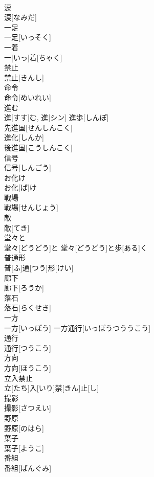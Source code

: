 \documentclass[8pt]{extreport}
\begin{document}
\begin{CJK}{UTF8}{min}
\\	涙	
\\	涙[なみだ]	
\\	一足	
\\	一足[いっそく]	
\\	一着	
\\	一[いっ]着[ちゃく]	
\\	禁止	
\\	禁止[きんし]	
\\	命令	
\\	命令[めいれい]	
\\	進む	
\\	進[すす]む, 進[シン]	進歩[しんぽ] 
\\	先進国[せんしんこく] 
\\	進化[しんか] 
\\	後進国[こうしんこく] 
\\	信号	
\\	信号[しんごう]	
\\	お化け	
\\	お化[ば]け	
\\	戦場	
\\	戦場[せんじょう]	
\\	敵	
\\	敵[てき]	
\\	堂々と	
\\	堂々[どうどう]と	堂々[どうどう]と歩[ある]く 
\\	普通形	
\\	普[ふ]通[つう]形[けい]	
\\	廊下	
\\	廊下[ろうか]	
\\	落石	
\\	落石[らくせき]	
\\	一方	
\\	一方[いっぽう]	一方通行[いっぽうつううこう] 
\\	通行	
\\	通行[つうこう]	
\\	方向	
\\	方向[ほうこう]	
\\	立入禁止	
\\	立[たち]入[いり]禁[きん]止[し]	
\\	撮影	
\\	撮影[さつえい]	
\\	野原	
\\	野原[のはら]	
\\	葉子	
\\	葉子[ようこ]	
\\	番組	
\\	番組[ばんぐみ]	

\end{CJK}
\end{document}
